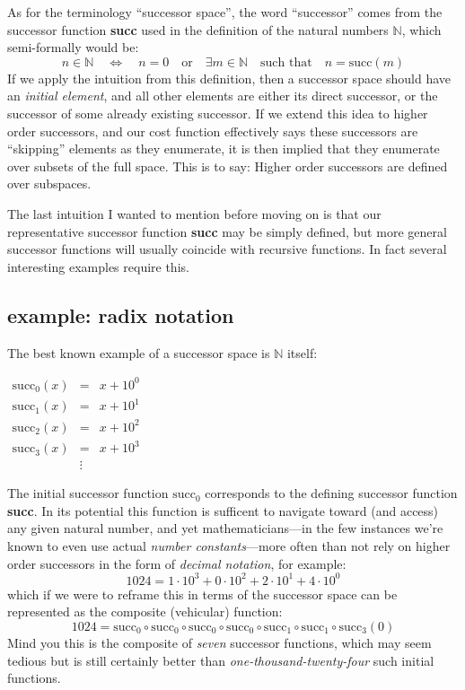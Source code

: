 \documentclass[twoside]{article}
\begin{document}
As for the terminology ``successor space'', the word ``successor'' comes from the successor function {\bfseries succ} used
in the definition of the natural numbers $ \mathbb{N} $, which semi-formally would be:
$$ n\in\mathbb{N}\quad\Longleftrightarrow\quad
   n = 0\quad\mbox{or}\quad\exists m\in\mathbb{N}\quad\mbox{such that}\quad n = \mbox{succ}(m) $$
If we apply the intuition from this definition, then a successor space should have an \emph{initial element},
and all other elements are either its direct successor, or the successor of some already existing successor.
If we extend this idea to higher order successors, and our cost function effectively says these successors are
``skipping'' elements as they enumerate, it is then implied that they enumerate over subsets of the full space.
This is to say: Higher order successors are defined over subspaces.

The last intuition I wanted to mention before moving on is that our representative successor function {\bfseries succ}
may be simply defined, but more general successor functions will usually coincide with recursive functions.
In fact several interesting examples require this.

\subsection*{example: radix notation}

The best known example of a successor space is $ \mathbb{N} $ itself:

\begin{center}
$ \begin{array}{rcl}
\mbox{succ}_0(x) & =		& x + 10^0	\\
\mbox{succ}_1(x) & =		& x + 10^1	\\
\mbox{succ}_2(x) & =		& x + 10^2	\\
\mbox{succ}_3(x) & =		& x + 10^3	\\
		 & \vdots	&
\end{array} $
\end{center}

The initial successor function $ \mbox{succ}_0 $ corresponds to the defining successor function {\bfseries succ}.
In its potential this function is sufficent to navigate toward (and access) any given natural number, and yet
mathematicians---in the few instances we're known to even use actual \emph{number constants}---more often
than not rely on higher order successors in the form of \emph{decimal notation}, for example:
$$ 1024 = 1\cdot 10^3 + 0\cdot 10^2 + 2\cdot 10^1 + 4\cdot 10^0 $$
which if we were to reframe this in terms of the successor space can be represented as the composite (vehicular) function:
$$ 1024 = \mbox{succ}_0 \circ \mbox{succ}_0 \circ \mbox{succ}_0 \circ \mbox{succ}_0 \circ
   \mbox{succ}_1 \circ \mbox{succ}_1 \circ \mbox{succ}_3 (0) $$
Mind you this is the composite of \emph{seven} successor functions, which may seem tedious but is still certainly better
than \emph{one-thousand-twenty-four} such initial functions.
\end{document}

